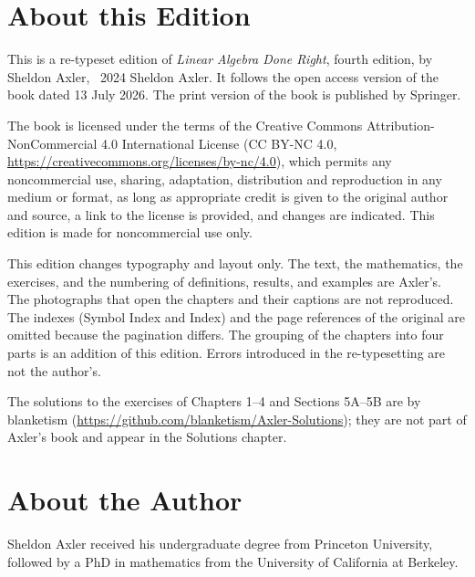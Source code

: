 
\chapter*{About this Edition}

This is a re-typeset edition of \emph{Linear Algebra Done Right}, fourth
edition, by Sheldon Axler, \textcopyright\ 2024 Sheldon Axler. It follows the
open access version of the book dated 13 July 2026. The print version of the
book is published by Springer.

The book is licensed under the terms of the Creative Commons
Attribution-NonCommercial 4.0 International License (CC BY-NC 4.0,
\url{https://creativecommons.org/licenses/by-nc/4.0}), which permits any
noncommercial use, sharing, adaptation, distribution and reproduction in any
medium or format, as long as appropriate credit is given to the original author
and source, a link to the license is provided, and changes are indicated. This
edition is made for noncommercial use only.

This edition changes typography and layout only. The text, the mathematics,
the exercises, and the numbering of definitions, results, and examples are
Axler's. The photographs that open the chapters and their captions are not
reproduced. The indexes (Symbol Index and Index) and the page references of the
original are omitted because the pagination differs. The grouping of the
chapters into four parts is an addition of this edition. Errors introduced in the
re-typesetting are not the author's.

The solutions to the exercises of Chapters 1--4 and Sections 5A--5B are by
blanketism (\url{https://github.com/blanketism/Axler-Solutions}); they are not
part of Axler's book and appear in the Solutions chapter.

\chapter*{About the Author}

Sheldon Axler received his undergraduate degree from Princeton University,
followed by a PhD in mathematics from the University of California at
Berkeley.

